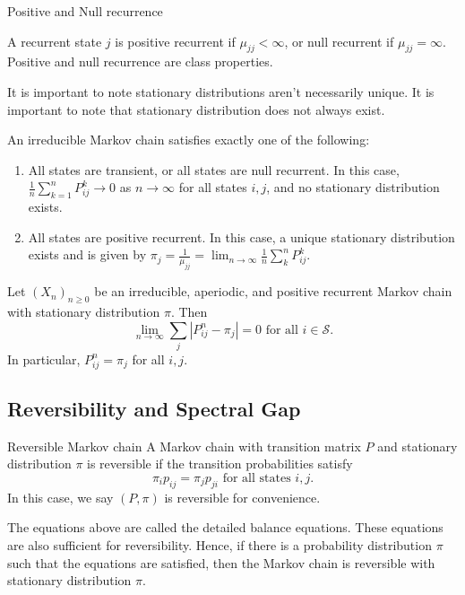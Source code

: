 \begin{defn}{Positive and Null recurrence}{}

    A recurrent state \( j \) is positive recurrent if \( \mu _{jj} < \infty  \), or null recurrent if \( \mu _{jj} = \infty  \). Positive and null recurrence are class properties.

\end{defn}

It is important to note stationary distributions aren't necessarily unique. It is important to note that stationary distribution does not always exist. 



\begin{thrm}{}{}
An irreducible Markov chain satisfies exactly one of the following:
\begin{enumerate}
    \item All states are transient, or all states are null recurrent. In this case, \( \frac{1}{n}\sum_{k = 1}  ^n P_{ij}^k \to 0 \) as \( n \to \infty  \) for all states \( i,j \), and no stationary distribution exists. 
    \item All states are positive recurrent. In this case, a unique stationary distribution exists and is given by \( \pi _{j} = \frac{1}{\mu _{ j j }} = \lim_{n \to \infty} \frac{1}{n}\sum_{k}^n P^k_{ij}  \). 
\end{enumerate}


\end{thrm}

\begin{thrm}{}{}
    Let \( (X_{n} )_{n\geq 0} \) be an irreducible, aperiodic, and positive recurrent Markov chain with stationary distribution \( \pi \). Then
    \[
        \lim_{n \to \infty} \sum_{j} \left\lvert P_{ij}^n - \pi _{j}   \right\rvert = 0 \text{ for all  } i  \in \mathcal{S} . 
    \] In particular, \( P^n_{ij}  = \pi _{j}\) for all \( i, j \). 
    \end{thrm}

\subsection{Reversibility and Spectral Gap}

\begin{defn}{Reversible Markov chain}{}
A Markov chain with transition matrix \( P \) and stationary distribution \( \pi     \) is reversible if the transition probabilities satisfy
\[
    \pi _{i} p_{ij} = \pi _{j} p_{ji}  \text{ for all states } i,j.
\]
In this case, we say \( (P, \pi ) \) is reversible for convenience.

The equations above are called the detailed balance equations. These equations are also sufficient for reversibility. Hence, if there is a probability distribution \( \pi   \) such that the equations are satisfied, then the Markov chain is reversible with stationary distribution \( \pi  \). 
\end{defn}

